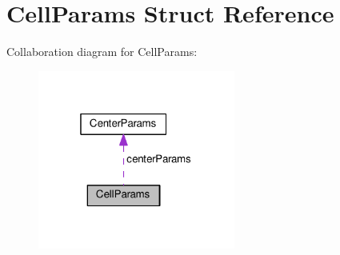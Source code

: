 \hypertarget{struct_cell_params}{}\section{Cell\+Params Struct Reference}
\label{struct_cell_params}


Collaboration diagram for Cell\+Params\+:
\nopagebreak
\begin{figure}[H]
\begin{center}
\leavevmode
\includegraphics[width=184pt]{struct_cell_params__coll__graph}
\end{center}
\end{figure}
